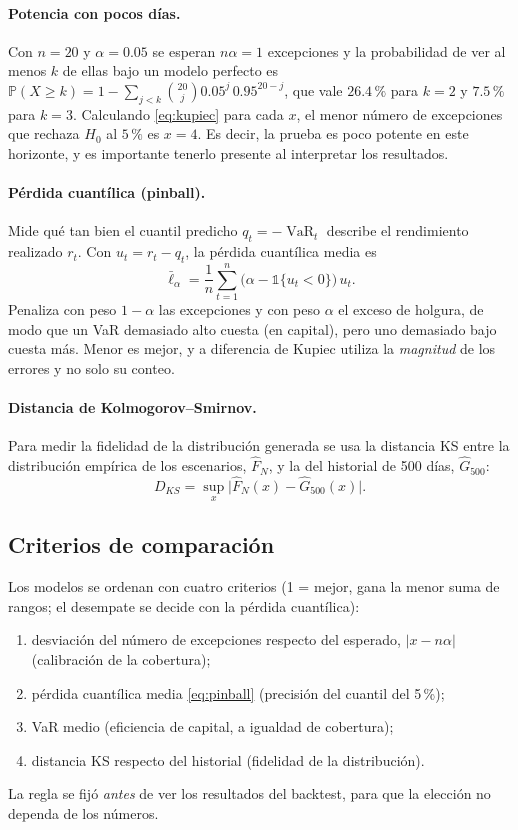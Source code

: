 \documentclass[12pt,letterpaper]{article}
\newcommand{\Prob}{\mathbb{P}}
\newcommand{\VaR}{\operatorname{VaR}}
\newcommand{\ind}{\mathbb{1}}
\begin{document}
\paragraph{Potencia con pocos días.}
Con $n=20$ y $\alpha=0.05$ se esperan $n\alpha=1$ excepciones y la probabilidad de ver al menos $k$ de ellas bajo un modelo perfecto es $\Prob(X\ge k)=1-\sum_{j<k}\binom{20}{j}0.05^j\,0.95^{20-j}$, que vale $26.4\,\%$ para $k=2$ y $7.5\,\%$ para $k=3$. Calculando \eqref{eq:kupiec} para cada $x$, el menor número de excepciones que rechaza $H_0$ al $5\,\%$ es $x=4$. Es decir, la prueba es poco potente en este horizonte, y es importante tenerlo presente al interpretar los resultados.

\paragraph{Pérdida cuantílica (pinball).}
Mide qué tan bien el cuantil predicho $q_t=-\VaR_t$ describe el rendimiento realizado $r_t$. Con $u_t=r_t-q_t$, la pérdida cuantílica media es \cite{koenker1978}
\begin{equation}\label{eq:pinball}
  \bar\ell_\alpha=\frac1n\sum_{t=1}^{n}\big(\alpha-\ind\{u_t<0\}\big)\,u_t .
\end{equation}
Penaliza con peso $1-\alpha$ las excepciones y con peso $\alpha$ el exceso de holgura, de modo que un VaR demasiado alto cuesta (en capital), pero uno demasiado bajo cuesta más. Menor es mejor, y a diferencia de Kupiec utiliza la \emph{magnitud} de los errores y no solo su conteo.

\paragraph{Distancia de Kolmogorov--Smirnov.}
Para medir la fidelidad de la distribución generada se usa la distancia KS entre la distribución empírica de los escenarios, $\hat F_N$, y la del historial de 500 días, $\hat G_{500}$:
\begin{equation}
  D_{KS}=\sup_x\big|\hat F_N(x)-\hat G_{500}(x)\big| .
\end{equation}

\subsection{Criterios de comparación}

Los modelos se ordenan con cuatro criterios (1 = mejor, gana la menor suma de rangos; el desempate se decide con la pérdida cuantílica):
\begin{enumerate}[label=(\roman*), nosep]
  \item desviación del número de excepciones respecto del esperado, $|x-n\alpha|$ (calibración de la cobertura);
  \item pérdida cuantílica media \eqref{eq:pinball} (precisión del cuantil del 5\,\%);
  \item VaR medio (eficiencia de capital, a igualdad de cobertura);
  \item distancia KS respecto del historial (fidelidad de la distribución).
\end{enumerate}
La regla se fijó \emph{antes} de ver los resultados del backtest, para que la elección no dependa de los números.
\end{document}
